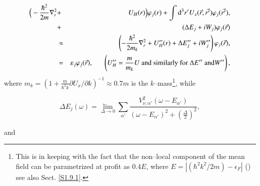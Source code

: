 \begin{eqnarray}\label{eqn:36}
\nonumber
\Big( -\frac{\hbar^2}{2m} \nabla_r^2 &+& U_H(r)\Big) \varphi_{j}(r) + \int {\rm d}^3 r' U_x(\vec{r},\vec{r'})\varphi_j(\vec{r'}), \\
\nonumber
&+& (\Delta E_j +iW_j)\varphi_j(\vec{r}) \\
&\approx& \left( -\frac{\hbar^2}{2m_k} \nabla_r^2 + U_H''(r) + \Delta E''_j + iW''_j \right) \varphi_j(\vec{r}), \\
\nonumber
&=& \varepsilon_j\varphi_j(\vec{r}), \;\;\;\;\;\; \left( U_H'' = \frac{m}{m_k} U\text{ and similarly for }\Delta E''\text{ and} W'' \right), 
\end{eqnarray}
 where  $m_k=\left(1+\frac{m}{\hbar^2 k}\partial U_x/\partial k\right)^{-1}\approx 0.7m$ is the $k$--mass\footnote{This is in keeping with the fact that the non--local component of the mean field can be parametrized at profit as 0.4$E$, where $E=|(\hbar^2k^2/2m)-\epsilon_F|$ (\cite{Perey:62}) see also Sect. \ref{S1.9.1}.}, while

\begin{equation}\label{eqn:37a}
\Delta E_j(\omega)  = \lim_{\Delta \rightarrow 0} \sum_{\alpha'} \frac{V^2_{\nu ,\alpha'} (\omega-E_{\alpha'})}{(\omega -E_{\alpha'})^2 + (\frac{\Delta}{2})^2},
\end{equation}

\noindent and

